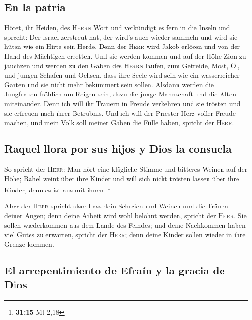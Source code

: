 \hypertarget{en-la-patria}{%
\subsection{En la patria}\label{en-la-patria}}

 Höret, ihr Heiden, des \textsc{Herrn} Wort und
verkündigt es fern in die Inseln und sprecht: Der Israel zerstreut hat,
der wird's auch wieder sammeln und wird sie hüten wie ein Hirte sein
Herde.  Denn der \textsc{Herr} wird Jakob erlösen und von
der Hand des Mächtigen erretten.  Und sie werden kommen
und auf der Höhe Zion zu jauchzen und werden zu den Gaben des
\textsc{Herrn} laufen, zum Getreide, Most, Öl, und jungen Schafen und
Ochsen, dass ihre Seele wird sein wie ein wasserreicher Garten und sie
nicht mehr bekümmert sein sollen.  Alsdann werden die
Jungfrauen fröhlich am Reigen sein, dazu die junge Mannschaft und die
Alten miteinander. Denn ich will ihr Trauern in Freude verkehren und sie
trösten und sie erfreuen nach ihrer Betrübnis.  Und ich
will der Priester Herz voller Freude machen, und mein Volk soll meiner
Gaben die Fülle haben, spricht der \textsc{Herr}.

\hypertarget{raquel-llora-por-sus-hijos-y-dios-la-consuela}{%
\subsection{Raquel llora por sus hijos y Dios la
consuela}\label{raquel-llora-por-sus-hijos-y-dios-la-consuela}}

 So spricht der \textsc{Herr}: Man hört eine klägliche
Stimme und bitteres Weinen auf der Höhe; Rahel weint über ihre Kinder
und will sich nicht trösten lassen über ihre Kinder, denn es ist aus mit
ihnen. \footnote{\textbf{31:15} Mt 2,18}

 Aber der \textsc{Herr} spricht also: Lass dein Schreien
und Weinen und die Tränen deiner Augen; denn deine Arbeit wird wohl
belohnt werden, spricht der \textsc{Herr}. Sie sollen wiederkommen aus
dem Lande des Feindes;  und deine Nachkommen haben viel
Gutes zu erwarten, spricht der \textsc{Herr}; denn deine Kinder sollen
wieder in ihre Grenze kommen.

\hypertarget{el-arrepentimiento-de-efrauxedn-y-la-gracia-de-dios}{%
\subsection{El arrepentimiento de Efraín y la gracia de
Dios}\label{el-arrepentimiento-de-efrauxedn-y-la-gracia-de-dios}}


